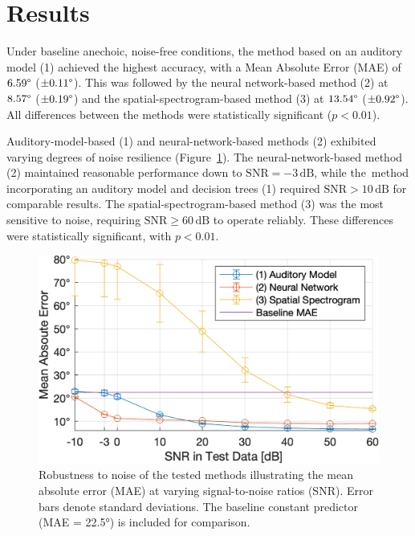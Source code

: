 \section{Results}

Under baseline anechoic, noise-free conditions, the method based on an auditory model (1) achieved the highest accuracy, with a Mean Absolute Error (MAE) of $6.59\degree$ ($\pm0.11\degree$). This was followed by the neural network-based method (2) at $8.57\degree$ ($\pm0.19\degree$) and the spatial-spectrogram-based method (3) at $13.54\degree$ ($\pm0.92\degree$). All differences between the methods were statistically significant ($p<0.01$).

Auditory-model-based (1) and neural-network-based methods (2) exhibited varying degrees of noise resilience (Figure~\ref{fig:snr}). The neural-network-based method (2) maintained reasonable performance down to $\mathrm{SNR}=-3\,\mathrm{dB}$, while the~method incorporating an auditory model and decision trees (1) required $\mathrm{SNR}>10\,\mathrm{dB}$ for comparable results. The spatial-spectrogram-based method (3) was the most sensitive to noise, requiring $\mathrm{SNR} \geq 60\,\mathrm{dB}$ to operate reliably. These differences were statistically significant, with $p<0.01$.

\begin{figure}[htbp]
	\begin{center}
		\includegraphics[width=1.0\linewidth]{img/mae_snr_full.png} 
	\end{center}
	\caption{Robustness to noise of the tested methods illustrating the mean absolute error (MAE) at varying signal-to-noise ratios (SNR). Error bars denote standard deviations. The baseline constant predictor (MAE = 22.5°) is included for comparison.} \label{fig:snr}
\end{figure}

